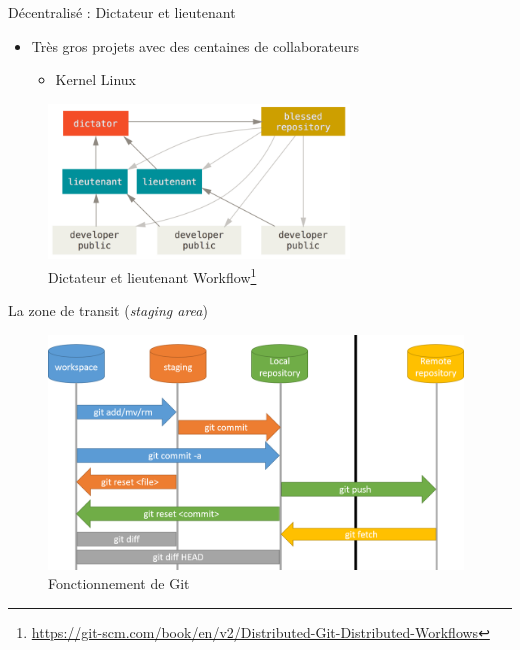 \documentclass[xcolor=x11names,compress]{beamer}
\begin{document}
\begin{frame}{Décentralisé : Dictateur et lieutenant}
	\begin{itemize}
		\item Très gros projets avec des centaines de collaborateurs
			\begin{itemize}
				\item Kernel Linux
			\end{itemize}
	\end{itemize}
	\begin{figure}[H]
		\centering
		\includegraphics[width=8cm]{images/1-bases/dictateur-lieutenant-wf.png}
		\caption{Dictateur et lieutenant Workflow\footnote{\tiny{\url{https://git-scm.com/book/en/v2/Distributed-Git-Distributed-Workflows}}}}
	\end{figure}
\end{frame}

\begin{frame}{La zone de transit (\textit{staging area})}
	\begin{figure}[H]
		\vspace{-10px}
		\includegraphics[width=11cm]{images/1-bases/staging.png}
		\caption{Fonctionnement de Git}
	\end{figure}	
\end{frame}
\end{document}
